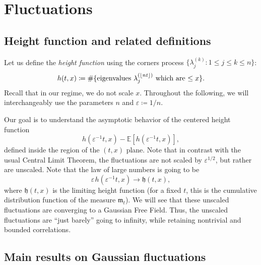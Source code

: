 \documentclass[letterpaper,11pt,oneside,reqno]{article}
\numberwithin{equation}{section}
\newcommand{\ssp}{\hspace{1pt}}
\theoremstyle{definition}
\begin{document}
\section{Fluctuations}

\subsection{Height function and related definitions}

Let us define the \emph{height function} using the corners process
$\{ \lambda^{(k)}_j\colon 1\le j\le k\le n \}$:
\begin{equation*}
	h(t,x)\coloneqq \#
	\{ \textnormal{eigenvalues $\lambda^{(\lfloor nt \rfloor )}_j$ which
	are $\leq x$} \}.
\end{equation*}
Recall that in our regime, we do not scale $x$.
Throughout the following, we will interchangeably use
the parameters $n$ and
$\varepsilon\coloneqq 1/n$.

Our goal is to understand the asymptotic behavior of the centered height function
$$
h(\varepsilon^{-1}t, x) - \mathbb{E}[h(\varepsilon^{-1}t, x)]
,
$$
defined inside the region of the $(t,x)$ plane.
Note that in contrast with the usual Central Limit Theorem,
the fluctuations are not scaled by $\varepsilon^{1/2}$,
but rather are unscaled.
Note that the law of large numbers is going to be
\begin{equation*}
	\varepsilon
	\ssp h(\varepsilon^{-1}t, x) \to
	\mathfrak{h}(t,x),
\end{equation*}
where $\mathfrak{h}(t,x)$ is the limiting height function
(for a fixed $t$, this is the cumulative distribution function
of the measure $\mathfrak{m}_t$).
We will see that these unscaled fluctuations are
converging to a Gaussian Free Field. Thus,
the unscaled fluctuations
are ``just barely'' going to infinity,
while retaining nontrivial and bounded correlations.



\subsection{Main results on Gaussian fluctuations}
\end{document}
